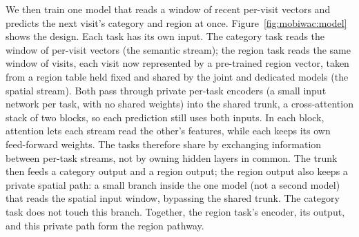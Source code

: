 We then train one model that reads a window of recent per-visit vectors and predicts the next visit's category and region at once. Figure~\ref{fig:mobiwac:model} shows the design. Each task has its own input. The category task reads the window of per-visit vectors (the semantic stream); the region task reads the same window of visits, each visit now represented by a pre-trained region vector, taken from a region table held fixed and shared by the joint and dedicated models (the spatial stream). Both pass through private
per-task encoders (a small input network per task, with no shared weights) into the shared trunk, a cross-attention stack of two blocks, so each prediction still uses both inputs. In each block, attention lets each
stream read the other's features, while each keeps its own feed-forward
weights. The tasks therefore share by exchanging information between per-task
streams, not by owning hidden layers in common. The trunk then feeds a category output and a region output; the region output also keeps a private spatial path: a small branch inside the one model (not a second model) that reads the spatial input window, bypassing the shared trunk. The category task does not touch this branch. Together, the region task's encoder, its output, and this private path form the region pathway.


